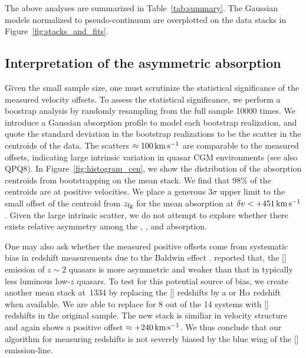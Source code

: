 \documentclass[iop]{emulateapj}
\begin{document}
The above analyses are summarized in Table~\ref{tab:summary}. The 
Gaussian models normalized to pseudo-continuum are overplotted on the data stacks in 
Figure~\ref{fig:stacks_and_fits}. 

%


\subsection{Interpretation of the asymmetric absorption}
\label{sec:significance_+ve}

Given the small sample size, one must scrutinize the statistical significance of the measured 
velocity offsets. To assess the statistical significance, we perform a boostrap analysis by 
randomly resampling from the full sample 10000 times. We introduce a Gaussian absorption profile 
to model each bootstrap realization, and quote the standard deviation in the bootstrap 
realizations to be the scatter in the centroids of the data. The scatters 
$\approx100\,{\rm km\,s^{-1}}$ are comparable to the measured offsets, indicating large intrinsic 
variation in quasar CGM environments (see also QPQ8). In Figure~\ref{fig:histogram_cen}, we show 
the distribution of the absorption centroids from bootstrapping on the  mean stack. We 
find that 98\% of the centroids are at positive velocities. We place a generous $3\sigma$ upper 
limit to the small offset of the centroid from $z_{\rm fg}$ for the  mean absorption at 
$\delta v<+451\,{\rm km\,s^{-1}}$. Given the large intrinsic scatter, we do not attempt to explore 
whether there exists relative asymmetry among the , , and  
absorption. 

One may also ask whether the measured positive offsets come from systematic bias in redshift 
measurements due to the Baldwin effect \citep{Baldwin77}. \cite{Shen16} reported that, the 
[] emission of $z\sim2$ quasars is more asymmetric and weaker than that in typically 
less luminous low-$z$ quasars. To test for this potential source of bias, we create another mean 
stack at \,1334 by replacing the [] redshifts by a  or H$\alpha$ 
redshift when available. We are able to replace for 8 out of the 14 systems with [] 
redshifts in the original sample. The new stack is similiar in velocity structure and again shows 
a positive offset $\approx+240\,{\rm km\,s^{-1}}$. We thus conclude that our algorithm for 
measuring redshifts is not severely biased by the blue wing of the [] emission-line. 
\end{document}
